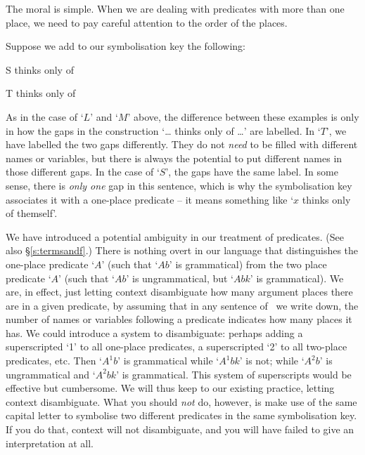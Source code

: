 The moral is simple. When we are dealing with predicates with more than one place, we need to pay careful attention to the order of the places.

Suppose we add to our symbolisation key the following:
	\begin{ekey}
		\item[S]  thinks only of 
		\item[T]  thinks only of 
	\end{ekey}
As in the case of `$L$' and `$M$' above, the difference between these examples is only in how the gaps in the construction `… thinks only of …' are labelled. In `$T$', we have labelled the two gaps differently. They do not \emph{need} to be filled with different names or variables, but there is always the potential to put different names in those different gaps. In the case of `$S$', the gaps have the same label. In some sense, there is \emph{only one} gap in this sentence, which is why the symbolisation key associates it with a one-place predicate – it means something like `$x$ thinks only of themself'.


We have introduced a potential ambiguity in our treatment of predicates. (See also §\ref{s:termsandf}.) There is nothing overt in our language that distinguishes the one-place predicate `$A$' (such that `$Ab$' is grammatical) from the two place predicate `$A$' (such that `$Ab$' is ungrammatical, but `$Abk$' is grammatical). We are, in effect, just letting context disambiguate how many argument places there are in a given predicate, by assuming that in any sentence of \FOL\ we write down, the number of names or variables following a predicate indicates how many places it has. We could introduce a system to disambiguate: perhaps adding a superscripted `1' to all one-place predicates, a superscripted `2' to all two-place predicates, etc. Then `$A^{1}b$' is grammatical while `$A^{1}bk$' is not; while `$A^{2}b$' is ungrammatical and `$A^{2}bk$' is grammatical. This system of superscripts would be effective but cumbersome. We will thus keep to our existing practice, letting context disambiguate. What you should \emph{not} do, however, is make use of the same capital letter to symbolise two different predicates in the same symbolisation key. If you do that, context will not disambiguate, and you will have failed to give an interpretation at all. 


